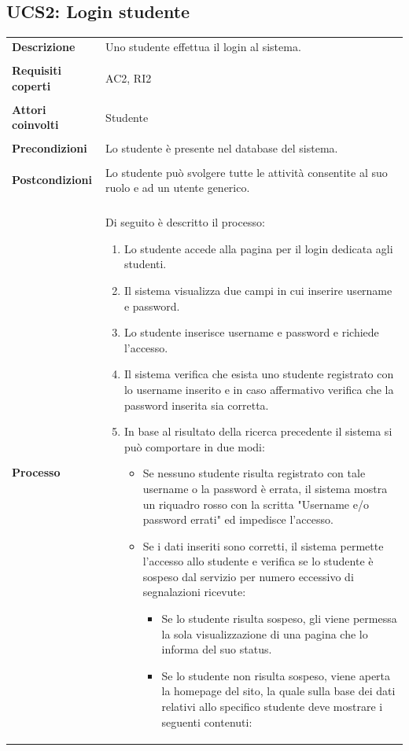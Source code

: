 \documentclass[10pt,a4paper]{report}
\begin{document}
	\subsection{UCS2: Login studente}
	\begin{tabular}{lp{}}
		\textbf{Descrizione}&Uno studente effettua il login al sistema.\\
		\\
		\textbf{Requisiti coperti}&AC2, RI2\\
		\\
		\textbf{Attori coinvolti}&Studente\\
		\\
		\textbf{Precondizioni}&Lo studente è presente nel database del sistema.\\
		\\
		\textbf{Postcondizioni}&Lo studente può svolgere tutte le attività consentite al suo ruolo e ad un utente generico.\\
		\\
		\textbf{Processo}&Di seguito è descritto il processo:
		\begin{enumerate}
			\item Lo studente accede alla pagina per il login dedicata agli studenti.
			\item Il sistema visualizza due campi in cui inserire username e password.
			\item Lo studente inserisce username e password e richiede l'accesso.
			\item Il sistema verifica che esista uno studente registrato con lo username inserito e in caso affermativo verifica che la password inserita sia corretta.
			\item In base al risultato della ricerca precedente il sistema si può comportare in due modi:
			\begin{itemize}
				\item Se nessuno studente risulta registrato con tale username o la password è errata, il sistema mostra un riquadro rosso con la scritta "Username e/o password errati" ed impedisce l'accesso.
				\item Se i dati inseriti sono corretti, il sistema permette l'accesso allo studente e verifica se lo studente è sospeso dal servizio per numero eccessivo di segnalazioni ricevute:
				\begin{itemize}
					\item Se lo studente risulta sospeso, gli viene permessa la sola visualizzazione di una pagina che lo informa del suo status.
					\item Se lo studente non risulta sospeso, viene aperta la homepage del sito, la quale sulla base dei dati relativi allo specifico studente deve mostrare i seguenti contenuti:

\end{itemize}
\end{itemize}
\end{enumerate}
\end{tabular}
\end{document}
